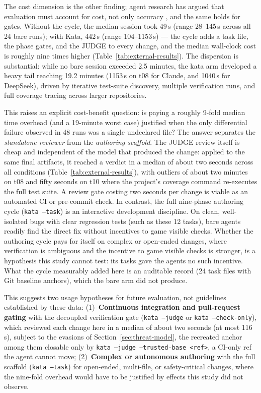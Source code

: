 \documentclass[11pt]{article}
\begin{document}
The cost dimension is the other finding; agent research has argued that
evaluation must account for cost, not only accuracy \cite{kapoor}, and the
same holds for gates. Without the cycle, the median session took 49\,s
(range 28--145\,s across all 24 bare runs); with Kata, 442\,s (range
104--1153\,s) --- the cycle adds a task file, the phase gates, and the
JUDGE to every change, and the median wall-clock cost is roughly nine times
higher (Table~\ref{tab:external-results}). The dispersion is substantial:
while no bare session exceeded 2.5 minutes, the kata arm developed a heavy
tail reaching 19.2 minutes (1153\,s on t08 for Claude, and 1040\,s for
DeepSeek), driven by iterative test-suite discovery, multiple verification
runs, and full coverage tracing across larger repositories.

This raises an explicit cost-benefit question: is paying a roughly 9-fold
median time overhead (and a 19-minute worst case) justified when the only
differential failure observed in 48 runs was a single undeclared file?
The answer separates the \emph{standalone reviewer} from the \emph{authoring
scaffold}. The JUDGE review itself is cheap and independent of the model
that produced the change: applied to the same final artifacts, it reached a
verdict in a median of about two seconds across all conditions (Table~\ref{tab:external-results}),
with outliers of about two minutes on t08 and fifty seconds on t10 where
the project's coverage command re-executes the full test suite. A review gate
costing two seconds per change is viable as an automated CI or pre-commit
check. In contrast, the full nine-phase authoring cycle (\texttt{kata --task})
is an interactive development discipline. On clean, well-isolated bugs with
clear regression tests (such as these 12 tasks), bare agents readily find
the direct fix without incentives to game visible checks. Whether the
authoring cycle pays for itself on complex or open-ended changes, where
verification is ambiguous and the incentive to game visible checks is
stronger, is a hypothesis this study cannot test: its tasks gave the agents
no such incentive. What the cycle measurably added here is an auditable
record (24 task files with Git baseline anchors), which the bare arm did not
produce.

This suggests two usage hypotheses for future evaluation, not guidelines
established by these data:
(1)~\textbf{Continuous integration and pull-request gating} with the decoupled verification gate (\texttt{kata --judge} or \texttt{kata --check-only}), which reviewed each change here in a median of about two seconds (at most 116\,s), subject to the evasions of Section~\ref{sec:threat-model}, the recreated anchor among them closable only by \texttt{kata --judge --trusted-base <ref>}, a CI-only ref the agent cannot move;
(2)~\textbf{Complex or autonomous authoring} with the full scaffold (\texttt{kata --task}) for open-ended, multi-file, or safety-critical changes, where the nine-fold overhead would have to be justified by effects this study did not observe.
\end{document}
